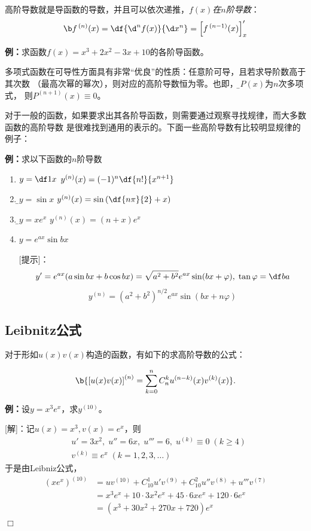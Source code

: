 高阶导数就是导函数的导数，并且可以依次递推，{\it $f(x)$在$n$阶导数}：
$${\b f^{\,(n)}(x)=\df{\d^nf(x)}{\d x^n}=\left[f^{\,(n-1)}(x)\right]'_x}$$

{\bf 例：}求函数$f(x)=x^3+2x^2-3x+10$的各阶导函数。

多项式函数在可导性方面具有非常“优良”的性质：任意阶可导，且若求导阶数高于其次数
（最高次幂的幂次），则对应的高阶导数恒为零。也即，{\b 若$P(x)$为$n$次多项式，
则$P^{(n+1)}(x)\equiv0$}。

对于一般的函数，如果要求出其各阶导函数，则需要通过观察寻找规律，而大多数函数的高阶导数
是很难找到通用的表示的。下面一些高阶导数有比较明显规律的例子：

{\bf 例：}求以下函数的$n$阶导数
\begin{enumerate}[(1)]
  \setlength{\itemindent}{1cm}
  \item $y=\df 1x$ \hfill $y^{(n)}(x)=(-1)^n\df{n!}{x^{n+1}}$ 
  \item {\b$y=\sin x$ \hfill
  $y^{(n)}(x)=\sin\left(\df{n\pi}{2}+x\right)$} 
  \item {\b$y=xe^x$ \hfill $y^{(n)}(x)=(n+x)e^x$}
  \item $y=e^{ax}\sin bx$

[提示]：
$$y'=e^{ax}(a\sin bx+b\cos
bx)=\sqrt{a^2+b^2}e^{ax}\sin(bx+\varphi),
\;\tan\varphi=\df ba$$
$$y^{(n)}=\left(a^2+b^2\right)^{n/2}e^{ax}\sin(bx+n\varphi)$$ 
\end{enumerate}

\subsection{Leibnitz公式}

对于形如$u(x)v(x)$构造的函数，有如下的求高阶导数的公式：

$${\b{\left[u(x)v(x)\right]^{(n)}=
\sum\limits_{k=0}^nC_n^ku^{(n-k)}(x)v^{(k)}(x)}}.$$

{\bf 例：}设$y=x^3e^x$，求$y^{(10)}$。

[解]：记$u(x)=x^3,v(x)=e^x$，则
\begin{align*}
	& u'=3x^2, \; u''=6x, \; u'''=6, \; u^{(k)}\equiv 0\;(k\geq 4)\\
	& v^{(k)}\equiv e^x\;(k=1,2,3,\ldots)
\end{align*}
于是由Leibniz公式，
\begin{align*}
	(xe^x)^{(10)}
	&=uv^{(10)}+C_{10}^1u'v^{(9)}+C_{10}^2u''v^{(8)}+u'''v^{(7)}\\
	&=x^3e^x+10\cdot 3x^2e^x+45\cdot 6xe^x+120\cdot 6e^x\\
	&=(x^3+30x^2+270x+720)e^x
\end{align*}
\hfill$\Box$

